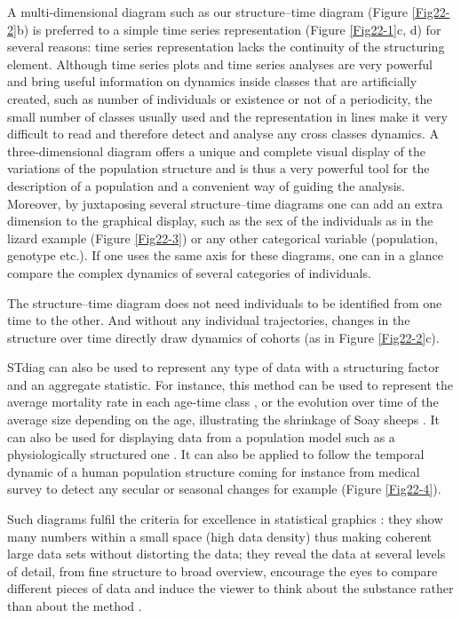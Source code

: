 A multi-dimensional diagram such as our structure--time diagram (Figure \ref{Fig22-2}b) is
preferred to a simple time series representation (Figure \ref{Fig22-1}c, d) for several
reasons: time series representation lacks the continuity of the structuring
element. Although time series plots and time series analyses are very powerful
and bring useful information on dynamics inside classes that are artificially
created, such as number of individuals or existence or not of a periodicity, the
small number of classes usually used and the representation in lines make it
very difficult to read and therefore detect and analyse any cross classes
dynamics. A three-dimensional diagram offers a unique and complete visual
display of the variations of the population structure and is thus a very
powerful tool for the description of a population and a convenient way of
guiding the analysis. Moreover, by juxtaposing several structure--time diagrams
one can add an extra dimension to the graphical display, such as the sex of the
individuals as in the lizard example (Figure \ref{Fig22-3}) or any other categorical variable
(population, genotype etc.). If one uses the same axis for these diagrams, one
can in a glance compare the complex dynamics of several categories of
individuals.

The structure--time diagram does not need individuals to be identified from one
time to the other. And without any individual trajectories, changes in the
structure over time directly draw dynamics of cohorts (as in Figure \ref{Fig22-2}c).

STdiag can also be used to represent any type of data with a structuring factor
and an aggregate statistic. For instance, this method can be used to represent
the average mortality rate in each age-time class \autocites{vaupel1987a}, or the evolution over time of the average size depending on the age,
illustrating the shrinkage of Soay sheeps \autocites{ozgul2009a}. It
can also be used for displaying data from a population model such as a physiologically
structured one \autocites{metz1986a}. It can also be applied to
follow the temporal dynamic of a human population structure coming for instance from
medical survey to detect any secular or seasonal changes for example (Figure \ref{Fig22-4}).

Such diagrams fulfil the criteria for excellence in statistical graphics
\autocites{tufte1990a}: they show many numbers within a small space (high
data density) thus making coherent large data sets without distorting the data; they reveal the
data at several levels of detail, from fine structure to broad overview,
encourage the eyes to compare different pieces of data and induce the viewer to
think about the substance rather than about the method \autocites{tufte2001a}.

